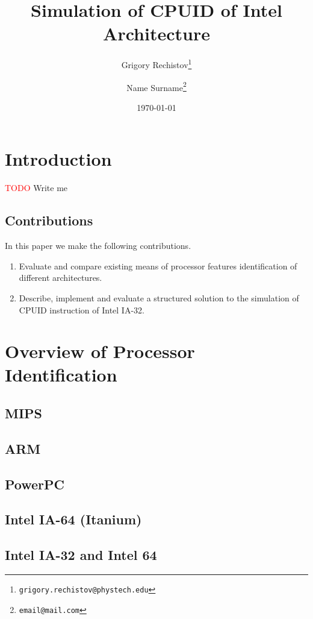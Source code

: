 \documentclass[a4paper,10pt,oneside,unicode]{article}
\author{Grigory Rechistov\thanks{\texttt{grigory.rechistov@phystech.edu}} \and Name Surname\thanks{\texttt{email@mail.com}}}
\title{Simulation of CPUID of Intel Architecture}
\date{\today}
\newcommand{\todo}[1][]{\textcolor{red}{TODO #1}}
\begin{document}
\maketitle

\tableofcontents

\section {Introduction}

\todo{Write me}

\subsection{Contributions}
In this paper we make the following contributions.
\begin{enumerate}
\item Evaluate and compare existing means of processor features identification of different architectures.
\item Describe, implement and evaluate a structured solution to the simulation of CPUID instruction of Intel IA-32.
\end{enumerate}

\section{Overview of Processor Identification}

\subsection{MIPS}
\subsection{ARM}
\subsection{PowerPC}

\subsection{Intel IA-64 (Itanium)}

\cite{itanium-sdm}

\subsection{Intel IA-32 and Intel 64}
\end{document}
